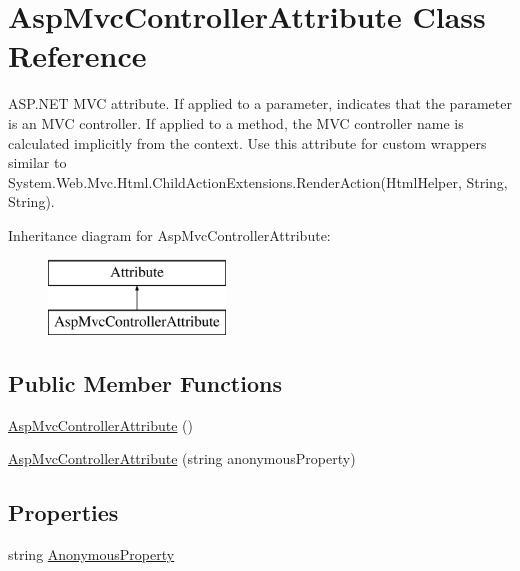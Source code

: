 \hypertarget{class_asp_mvc_controller_attribute}{}\section{Asp\+Mvc\+Controller\+Attribute Class Reference}
\label{class_asp_mvc_controller_attribute}


A\+S\+P.\+N\+E\+T M\+V\+C attribute. If applied to a parameter, indicates that the parameter is an M\+V\+C controller. If applied to a method, the M\+V\+C controller name is calculated implicitly from the context. Use this attribute for custom wrappers similar to {\ttfamily System.\+Web.\+Mvc.\+Html.\+Child\+Action\+Extensions.\+Render\+Action(\+Html\+Helper, String, String)}.  


Inheritance diagram for Asp\+Mvc\+Controller\+Attribute\+:\begin{figure}[H]
\begin{center}
\leavevmode
\includegraphics[height=2.000000cm]{class_asp_mvc_controller_attribute}
\end{center}
\end{figure}
\subsection*{Public Member Functions}
\begin{DoxyCompactItemize}
\item 
\hyperlink{class_asp_mvc_controller_attribute_ae20327545a89d7ad0f17c76fd0bdcb0f}{Asp\+Mvc\+Controller\+Attribute} ()
\item 
\hyperlink{class_asp_mvc_controller_attribute_a4e9eab92ec92d827df192a85b653f463}{Asp\+Mvc\+Controller\+Attribute} (string anonymous\+Property)
\end{DoxyCompactItemize}
\subsection*{Properties}
\begin{DoxyCompactItemize}
\item 
string \hyperlink{class_asp_mvc_controller_attribute_adb49d7099fe6a2366db45aca2e3488ab}{Anonymous\+Property}
\end{DoxyCompactItemize}



